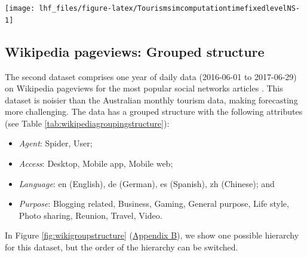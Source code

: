 \documentclass[11pt,a4paper,]{article}
\providecommand{\tightlist}{%
  \setlength{\itemsep}{0pt}\setlength{\parskip}{0pt}}
\let\origfigure\figure
\let\endorigfigure\endfigure
\renewenvironment{figure}[1][2] {
    \expandafter\origfigure\expandafter[!htbp]
} {
    \endorigfigure
}
\begin{document}
\begin{figure}

{\centering \texttt{[image: lhf\_files/figure-latex/TourismsimcomputationtimefixedlevelNS-1]} 

}

\caption{Computation time (seconds) for ETS, ARIMA and OLS with and without reconciliation - Fixed origin forecasts with 8, 10, 12 and 18 levels of hierarchy with 304, 608, 1520 and 3040 number of bottom level series - two years forecast points with 0.5 error value - Simulated tourism dataset.}\label{fig:TourismsimcomputationtimefixedlevelNS}
\end{figure}

\FloatBarrier

\hypertarget{wikipedia-pageviews-grouped-structure}{%
\subsection{Wikipedia pageviews: Grouped structure}\label{wikipedia-pageviews-grouped-structure}}

The second dataset comprises one year of daily data (2016-06-01 to 2017-06-29) on Wikipedia pageviews for the most popular social networks articles \autocite{ashouri2018}. This dataset is noisier than the Australian monthly tourism data, making forecasting more challenging. The data has a grouped structure with the following attributes (see Table \ref{tab:wikipediagroupingstructure}):

\begin{itemize}
\tightlist
\item
  \emph{Agent}: Spider, User;
\item
  \emph{Access}: Desktop, Mobile app, Mobile web;
\item
  \emph{Language}: en (English), de (German), es (Spanish), zh (Chinese); and
\item
  \emph{Purpose}: Blogging related, Business, Gaming, General purpose, Life style, Photo sharing, Reunion, Travel, Video.
\end{itemize}

In Figure \ref{fig:wikigroupstructure} (\protect\hyperlink{appendixB}{Appendix B}), we show one possible hierarchy for this dataset, but the order of the hierarchy can be switched.
\end{document}

